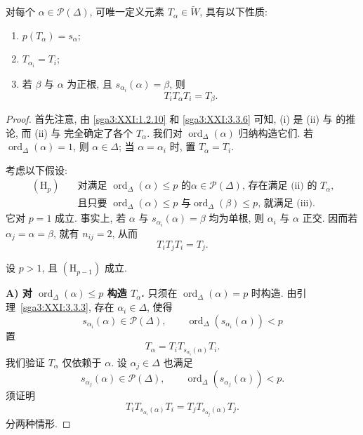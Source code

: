 \begin{lemma}\label{sga3:XXI:5.2}
对每个 \(\alpha\in\mathscr{P}(\Delta)\), 可唯一定义元素 \(T_\alpha\in\widetilde W\), 具有以下性质:
\begin{enumerate}
\item[(i)] \(p(T_\alpha)=s_\alpha\);
\item[(ii)] \(T_{\alpha_i}=T_i\);
\item[(iii)] 若 \(\beta\) 与 \(\alpha\) 为正根, 且 \(s_{\alpha_i}(\alpha)=\beta\), 则
\[
 T_iT_\alpha T_i=T_\beta.
\]
\end{enumerate}
\end{lemma}

\begin{proof}
首先注意, 由 \ref{sga3:XXI:1.2.10} 和 \ref{sga3:XXI:3.3.6} 可知, (i) 是 (ii) 与  的推论, 而 (ii) 与  完全确定了各个 \(T_\alpha\). 我们对 \(\operatorname{ord}_\Delta(\alpha)\) 归纳构造它们. 若 \(\operatorname{ord}_\Delta(\alpha)=1\), 则 \(\alpha\in\Delta\); 当 \(\alpha=\alpha_i\) 时, 置 \(T_\alpha=T_i\).

考虑以下假设:
\[
\begin{split}
(\mathrm{H}_p)\quad&
\text{对满足 \(\operatorname{ord}_\Delta(\alpha)\le p\) 的
\(\alpha\in\mathscr{P}(\Delta)\), 存在满足 (ii) 的 \(T_\alpha\),}\\
&\text{且只要 \(\operatorname{ord}_\Delta(\alpha)\le p\) 与
\(\operatorname{ord}_\Delta(\beta)\le p\), 就满足 (iii).}
\end{split}
\]
它对 \(p=1\) 成立. 事实上, 若 \(\alpha\) 与 \(s_{\alpha_i}(\alpha)=\beta\) 均为单根, 则 \(\alpha_i\) 与 \(\alpha\) 正交. 因而若 \(\alpha_j=\alpha=\beta\), 就有 \(n_{ij}=2\), 从而
\[
 T_iT_jT_i=T_j.
\]

设 \(p>1\), 且 \((\mathrm{H}_{p-1})\) 成立.

\medskip
\noindent\textbf{A) 对 \(\operatorname{ord}_\Delta(\alpha)\le p\) 构造 \(T_\alpha\).}
只须在 \(\operatorname{ord}_\Delta(\alpha)=p\) 时构造. 由引理~\ref{sga3:XXI:3.3.3}, 存在 \(\alpha_i\in\Delta\), 使得
\[
 s_{\alpha_i}(\alpha)\in\mathscr{P}(\Delta),
 \qquad
 \operatorname{ord}_\Delta(s_{\alpha_i}(\alpha))<p
\]
置
\begin{equation}
\tag{\(\star\)}
\label{sga3:XXI:5.2:construction}
 T_\alpha=T_iT_{s_{\alpha_i}(\alpha)}T_i.
\end{equation}
我们验证 \(T_\alpha\) 仅依赖于 \(\alpha\). 设 \(\alpha_j\in\Delta\) 也满足
\[
 s_{\alpha_j}(\alpha)\in\mathscr{P}(\Delta),
 \qquad
 \operatorname{ord}_\Delta(s_{\alpha_j}(\alpha))<p.
\]
须证明
\begin{equation}
\tag{\(+\)}
\label{sga3:XXI:5.2:independence}
 T_iT_{s_{\alpha_i}(\alpha)}T_i
 =T_jT_{s_{\alpha_j}(\alpha)}T_j.
\end{equation}
分两种情形.


\end{proof}
